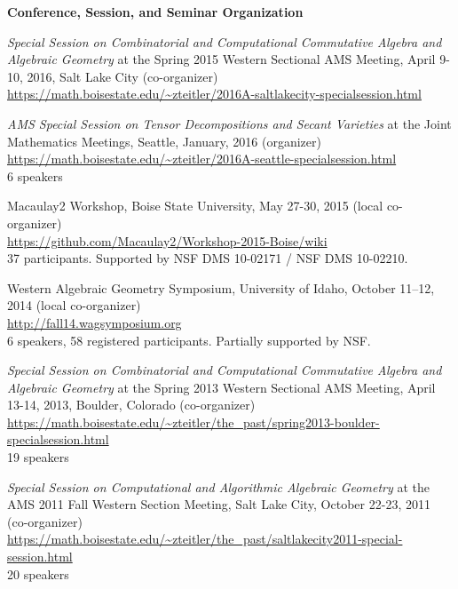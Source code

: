 \documentclass[12pt]{article}
\begin{document}
\textbf{Conference, Session, and Seminar Organization}
\begin{description}
\setlength{}
\item[] \textit{Special Session on Combinatorial and Computational
Commutative Algebra and Algebraic Geometry}
at the Spring 2015 Western Sectional AMS Meeting,
April 9-10, 2016, Salt Lake City (co-organizer) \\
\url{https://math.boisestate.edu/~zteitler/2016A-saltlakecity-specialsession.html}


\item[] \textit{AMS Special Session on Tensor Decompositions and Secant Varieties}
at the Joint Mathematics Meetings, Seattle, January, 2016 (organizer) \\
\url{https://math.boisestate.edu/~zteitler/2016A-seattle-specialsession.html} \\
6 speakers

\item[] Macaulay2 Workshop, Boise State University, May 27-30, 2015 (local co-organizer) \\
\url{https://github.com/Macaulay2/Workshop-2015-Boise/wiki} \\
37 participants. Supported by NSF DMS 10-02171 / NSF DMS 10-02210.

\item[] Western Algebraic Geometry Symposium, University of Idaho, October 11--12, 2014 (local co-organizer) \\
\url{http://fall14.wagsymposium.org} \\
6 speakers, 58 registered participants. Partially supported by NSF.

\item[] \textit{Special Session on Combinatorial and Computational
Commutative Algebra and Algebraic Geometry}
at the Spring 2013 Western Sectional AMS Meeting,
April 13-14, 2013, Boulder, Colorado (co-organizer) \\
\url{https://math.boisestate.edu/~zteitler/the_past/spring2013-boulder-specialsession.html} \\
19 speakers

\item[] \textit{Special Session on Computational and Algorithmic Algebraic Geometry}
at the AMS 2011 Fall Western Section Meeting, Salt Lake City, October 22-23, 2011 (co-organizer) \\
\url{https://math.boisestate.edu/~zteitler/the_past/saltlakecity2011-special-session.html} \\
20 speakers


\end{description}
\end{document}
